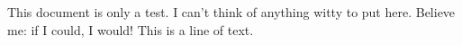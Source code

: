 \documentclass[a4paper]{article}
\begin{document}
This document is only a test.
I can't think of anything witty to put here.
Believe me: if I could, I would!
This is a line of text.
\end{document}
